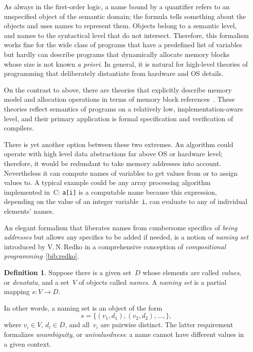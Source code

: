 \documentclass{article}
\theoremstyle{definition}
\newtheorem{Df}{Definition}
\begin{document}
As always in the first-order logic, a name bound by a quantifier refers to an
unspecified object of the semantic domain; the formula tells something about
the objects and uses names to represent them.  Objects belong to a semantic
level, and names to the syntactical level that do not intersect.  Therefore,
this formalism works fine for the wide class of programs that have a predefined
list of variables but hardly can describe programs that dynamically allocate
memory blocks whose size is not known \emph{a priori}.  In general, it is
natural for high-level theories of programming that deliberately distantiate
from hardware and OS details.

On the contrast to above, there are theories that explicitly describe memory
model and allocation operations in terms of memory block
references~\cite{bib:leroy}.  These theories reflect semantics of programs on a
relatively low, implementation-aware level, and their primary application is
formal specification and verification of compilers.

There is yet another option between these two extremes. An algorithm could
operate with high level data abstractions far above OS or hardware level;
therefore, it would be redundant to take memory addresses into account.
Nevertheless it can compute names of variables to get values from or to assign
values to. A typical example could be any array processing algorithm
implemented in~C: \lstinline{a[i]} is a computable name because this
expression, depending on the value of an integer variable~\lstinline{i}, can
evaluate to any of individual elements' names.

An elegant formalism that liberates names from cumbersome specifics of
\emph{being addresses} but allows any specifics to be added if needed,
is a notion of \emph{naming set} introduced by V.\,N.\,Redko in a
comprehensive conception of \emph{compositional programming}~\ref{bib:redko}.

\begin{Df}\label{df:naming-set}
Suppose there is a given set~$D$ whose elements are called \emph{values}, or
\emph{denotata}, and a set~$V$ of objects called \emph{names}.
A \emph{naming set} is a partial mapping $s: V\to D$.
\end{Df}

In other words, a naming set is an object of the form
\[
  s = \{ (v_1, d_1), (v_2, d_2), \ldots, \} ,
\]
where $v_i\in V$, $d_i\in D$, and all~$v_i$ are pairwise distinct. The
latter requirement formalizes \emph{unambiguity}, or \emph{univaluedness}: a
name cannot have different values in a given context.
\end{document}
